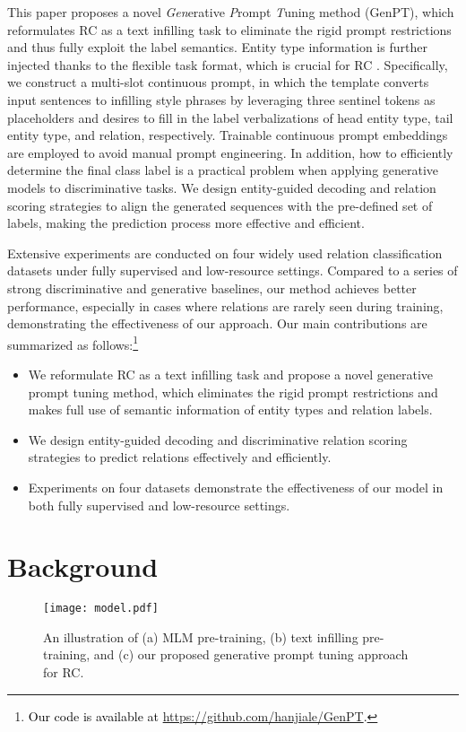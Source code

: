 \documentclass[11pt]{article}
\begin{document}
	
	This paper proposes a novel \textit{Gen}erative \textit{P}rompt \textit{T}uning method (GenPT), which reformulates RC as a text infilling task to eliminate the rigid prompt restrictions and thus fully exploit the label semantics. 
	Entity type information is further injected thanks to the flexible task format, which is crucial for RC \cite{DBLP:journals/corr/abs-2102-01373}. Specifically, we construct a multi-slot continuous prompt, in which the template converts input sentences to infilling style phrases by leveraging three sentinel tokens as placeholders and desires to fill in the label verbalizations of head entity type, tail entity type, and relation, respectively. Trainable continuous prompt embeddings are employed to avoid manual prompt engineering.
	In addition, how to efficiently determine the final class label is a practical problem when applying generative models to discriminative tasks. We design entity-guided decoding and relation scoring strategies to align the generated sequences with the pre-defined set of labels, making the prediction process more effective and efficient.
	
	
	Extensive experiments are conducted on four widely used relation classification datasets under fully supervised and low-resource settings. 
	Compared to a series of strong discriminative and generative baselines, our method achieves better performance, especially in cases where relations are rarely seen during training, demonstrating the effectiveness of our approach. Our main contributions are summarized as follows:\footnote{\textcolor{black}{Our code is available at \url{https://github.com/hanjiale/GenPT}.}}
\begin{itemize}
	\item We reformulate RC as a text infilling task and propose a novel generative prompt tuning method, which eliminates the rigid prompt restrictions and makes full use of semantic information of entity types and relation labels.
	\item We design entity-guided decoding and discriminative relation scoring strategies to predict relations effectively and efficiently.
	\item Experiments on four datasets demonstrate the effectiveness of our model in both fully supervised and low-resource settings.
\end{itemize}

\section{Background}
\begin{figure*}[t!]
\centering
	\texttt{[image: model.pdf]}
	\caption{An illustration of (a) MLM pre-training, (b) text infilling pre-training, and (c) our proposed generative prompt tuning approach for RC.}
	\label{model} 
\end{figure*}
\end{document}
